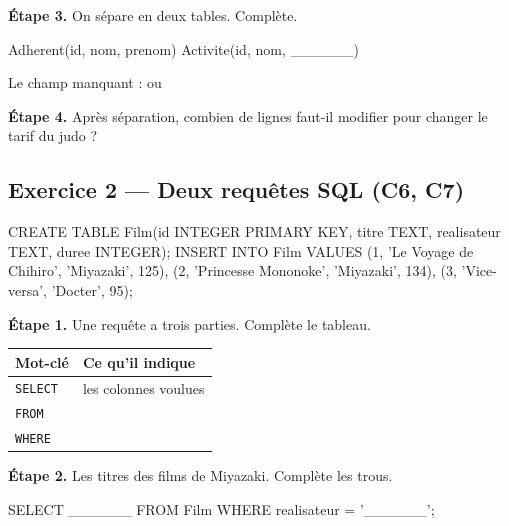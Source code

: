 \bigskip

\textbf{Étape 3.} On sépare en deux tables. Complète.

\begin{sql}
Adherent(id, nom, prenom)
Activite(id, nom, ______)
\end{sql}

\medskip
Le champ manquant :  \qquad ou \qquad {}

\bigskip

\textbf{Étape 4.} Après séparation, combien de lignes faut-il modifier pour
changer le tarif du judo ?

\medskip
\dotfill

\bigskip
\bigskip

\subsection*{Exercice 2 --- Deux requêtes SQL (C6, C7)}

\begin{sql}
CREATE TABLE Film(id INTEGER PRIMARY KEY, titre TEXT,
                  realisateur TEXT, duree INTEGER);
INSERT INTO Film VALUES
  (1, 'Le Voyage de Chihiro', 'Miyazaki', 125),
  (2, 'Princesse Mononoke',   'Miyazaki', 134),
  (3, 'Vice-versa',           'Docter',    95);
\end{sql}

\bigskip

\textbf{Étape 1.} Une requête a trois parties. Complète le tableau.

\bigskip

\begin{center}
\begin{tabular}{|l|l|}
\hline
\textbf{Mot-clé} & \textbf{Ce qu'il indique} \\
\hline
\texttt{SELECT} & les colonnes voulues \\
\hline
\texttt{FROM} & \dotfill \\
\hline
\texttt{WHERE} & \dotfill \\
\hline
\end{tabular}
\end{center}

\bigskip

\textbf{Étape 2.} Les titres des films de Miyazaki. Complète les trous.

\begin{sql}
SELECT ______ FROM Film WHERE realisateur = '______';
\end{sql}

